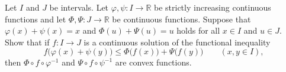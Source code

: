 Let $I$ and $J$ be intervals. Let $\varphi,\psi:I\to\mathbb{R}$ be strictly increasing continuous functions and let $\Phi,\Psi:J\to\mathbb{R}$ be continuous functions. Suppose that $\varphi(x)+\psi(x)=x$ and $\Phi(u)+\Psi(u)=u$ holds for all $x\in I$ and $u\in J$. Show that if $f:I\to J$ is a continuous solution of the functional inequality
$$f\big(\varphi(x)+\psi(y)\big)\le \Phi\big(f(x)\big)+\Psi\big(f(y)\big)\qquad (x,y\in I),$$then $\Phi\circ f\circ \varphi^{-1}$ and $\Psi\circ f\circ \psi^{-1}$ are convex functions.